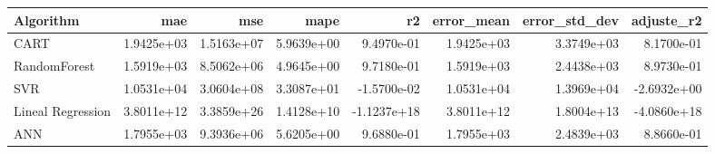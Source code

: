 \begin{tabular}{lrrrrrrr}
\toprule
Algorithm & mae & mse & mape & r2 & error_mean & error_std_dev & adjuste_r2 \\
\midrule
CART & 1.9425e+03 & 1.5163e+07 & 5.9639e+00 & 9.4970e-01 & 1.9425e+03 & 3.3749e+03 & 8.1700e-01 \\
RandomForest & 1.5919e+03 & 8.5062e+06 & 4.9645e+00 & 9.7180e-01 & 1.5919e+03 & 2.4438e+03 & 8.9730e-01 \\
SVR & 1.0531e+04 & 3.0604e+08 & 3.3087e+01 & -1.5700e-02 & 1.0531e+04 & 1.3969e+04 & -2.6932e+00 \\
Lineal Regression & 3.8011e+12 & 3.3859e+26 & 1.4128e+10 & -1.1237e+18 & 3.8011e+12 & 1.8004e+13 & -4.0860e+18 \\
ANN & 1.7955e+03 & 9.3936e+06 & 5.6205e+00 & 9.6880e-01 & 1.7955e+03 & 2.4839e+03 & 8.8660e-01 \\
\bottomrule
\end{tabular}
